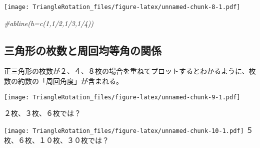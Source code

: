 \documentclass[]{article}
\newenvironment{Shaded}{\begin{snugshade}}{\end{snugshade}}
\newcommand{\KeywordTok}[1]{\textcolor[rgb]{0.13,0.29,0.53}{\textbf{#1}}}
\newcommand{\DataTypeTok}[1]{\textcolor[rgb]{0.13,0.29,0.53}{#1}}
\newcommand{\DecValTok}[1]{\textcolor[rgb]{0.00,0.00,0.81}{#1}}
\newcommand{\StringTok}[1]{\textcolor[rgb]{0.31,0.60,0.02}{#1}}
\newcommand{\CommentTok}[1]{\textcolor[rgb]{0.56,0.35,0.01}{\textit{#1}}}
\newcommand{\OperatorTok}[1]{\textcolor[rgb]{0.81,0.36,0.00}{\textbf{#1}}}
\newcommand{\NormalTok}[1]{#1}
\begin{document}
\texttt{[image: TriangleRotation\_files/figure-latex/unnamed-chunk-8-1.pdf]}

\begin{Shaded}
\begin{Highlighting}[]
\CommentTok{#abline(h=c(1,1/2,1/3,1/4))}
\end{Highlighting}
\end{Shaded}

\subsection{三角形の枚数と周回均等角の関係}\label{ux4e09ux89d2ux5f62ux306eux679aux6570ux3068ux5468ux56deux5747ux7b49ux89d2ux306eux95a2ux4fc2}

正三角形の枚数が２、４、８枚の場合を重ねてプロットするとわかるように、枚数の約数の「周回角度」が含まれる。

\begin{Shaded}
\end{Shaded}

\texttt{[image: TriangleRotation\_files/figure-latex/unnamed-chunk-9-1.pdf]}

２枚、３枚、６枚では？

\begin{Shaded}
\end{Shaded}

\texttt{[image: TriangleRotation\_files/figure-latex/unnamed-chunk-10-1.pdf]}
５枚、６枚、１０枚、３０枚では？

\begin{Shaded}
\end{Shaded}
\end{document}
